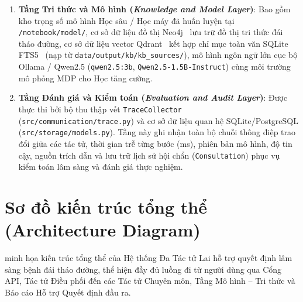 \begin{enumerate}[label=\textbf{Tầng \arabic*.}, wide=0pt, leftmargin=1.8cm]
  \item \textbf{Tầng Tri thức và Mô hình (\emph{Knowledge and Model Layer})}:
  Bao gồm kho trọng số mô hình Học sâu / Học máy đã huấn luyện tại \texttt{/notebook/model/}, cơ sở dữ liệu đồ thị Neo4j~\cite{neo4j} lưu trữ đồ thị tri thức đái tháo đường, cơ sở dữ liệu vector Qdrant~\cite{qdrant} kết hợp chỉ mục toàn văn SQLite FTS5~\cite{sqlitefts5} (nạp từ \texttt{data/output/kb/kb\_sources/}), mô hình ngôn ngữ lớn cục bộ Ollama / Qwen2.5 (\texttt{qwen2.5:3b}, \texttt{Qwen2.5-1.5B-Instruct}) cùng môi trường mô phỏng MDP cho Học tăng cường.

  \item \textbf{Tầng Đánh giá và Kiểm toán (\emph{Evaluation and Audit Layer})}:
  Được thực thi bởi bộ thu thập vết \texttt{TraceCollector} (\texttt{src/communication/trace.py}) và cơ sở dữ liệu quan hệ SQLite/PostgreSQL (\texttt{src/storage/models.py}). Tầng này ghi nhận toàn bộ chuỗi thông điệp trao đổi giữa các tác tử, thời gian trễ từng bước (ms), phiên bản mô hình, độ tin cậy, nguồn trích dẫn và lưu trữ lịch sử hội chẩn (\texttt{Consultation}) phục vụ kiểm toán lâm sàng và đánh giá thực nghiệm.
\end{enumerate}

\section{Sơ đồ kiến trúc tổng thể (Architecture Diagram)}
\label{sec:architecture-diagram}

 minh họa kiến trúc tổng thể của Hệ thống Đa Tác tử Lai hỗ trợ quyết định lâm sàng bệnh đái tháo đường, thể hiện đầy đủ luồng đi từ người dùng qua Cổng API, Tác tử Điều phối đến các Tác tử Chuyên môn, Tầng Mô hình -- Tri thức và Báo cáo Hỗ trợ Quyết định đầu ra.

